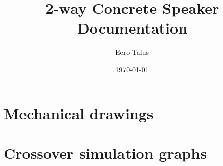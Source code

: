 \documentclass[10pt]{article}
\title{2-way Concrete Speaker Documentation}
\author{Eero Talus}
\date{\today}
\begin{document}
\begin{titlingpage}
\maketitle
\tableofcontents
\end{titlingpage}

\pagebreak
\null
\vfil
\centering\section{Mechanical drawings}
\vfil
\pagebreak







\pagebreak
\null
\vfil
\centering\section{Crossover simulation graphs}
\vfil
\pagebreak





\end{document}
